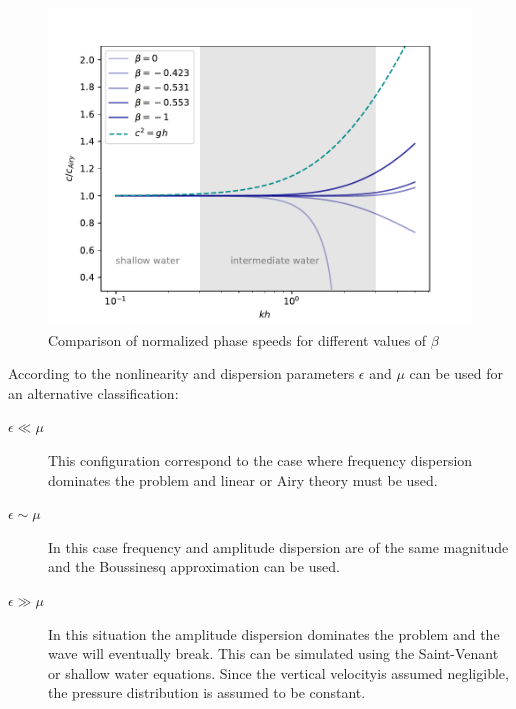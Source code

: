 \begin{figure}
    \centering
    \includegraphics[width=.8\textwidth]{img/eq/dispersion_beta.pdf}
    \caption{Comparison of normalized phase speeds for different values of $\beta$}
    \label{phase_speed_beta}
\end{figure}

According to \cite{ursell1953} the nonlinearity and dispersion parameters $\epsilon$ and $\mu$ can be used for an alternative classification:

\begin{description}
    \item[$\epsilon \ll \mu$]  This configuration correspond to the case where frequency dispersion dominates the problem and linear or Airy theory must be used.
    \item[$\epsilon \sim \mu$] In this case frequency and amplitude dispersion are of the same magnitude and the Boussinesq approximation can be used.
    \item[$\epsilon \gg \mu$] In this situation the amplitude dispersion dominates the problem and the wave will eventually break. This can be simulated using the Saint-Venant or shallow water equations. Since the vertical velocityis assumed negligible, the pressure distribution is assumed to be constant.
\end{description}








